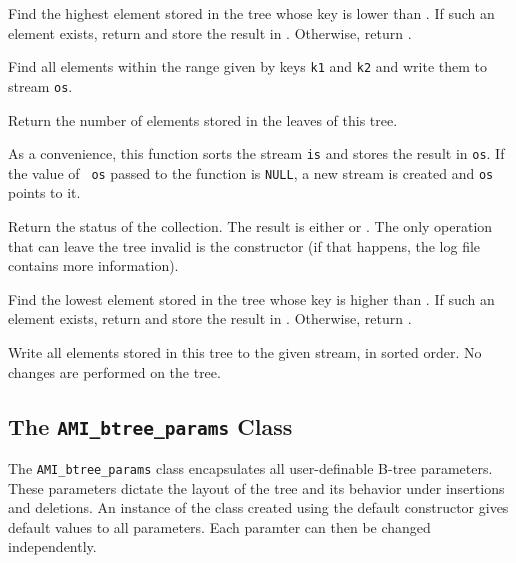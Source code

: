     {Find the highest
   element stored in the tree whose key is lower than . If such
   an element exists, return  and store the result in
   . Otherwise, return .}

    {Find all elements within the range given by
   keys {\tt k1} and {\tt k2} and write them to stream {\tt os}.}

    {Return the number of elements
   stored in the leaves of this tree.}

    {As a convenience, this function sorts the
   stream {\tt is} and stores the result in {\tt os}. If the value of {\tt
   os} passed to the function is {\tt NULL}, a new stream is created and
   {\tt os} points to it.}

    {Return the status
   of the collection. The result is either
    or
   . The only operation that can leave
   the tree invalid is the constructor (if that happens, the log file
   contains more information).}

    {Find the lowest
   element stored in the tree whose key is higher than . If such
   an element exists, return  and store the result in
   . Otherwise, return .}

    {Write all
   elements stored in this tree to the given stream, in sorted order. No
   changes are performed on the tree.}

\etabb

\subsection{The {\tt AMI\_btree\_params} Class}\label{ssec:params}
The {\tt AMI\_btree\_params} class encapsulates all user-definable B-tree
parameters. These parameters dictate the layout of the tree and its
behavior under insertions and deletions. An instance of the class created
using the default constructor gives default values to all parameters. Each
paramter can then be changed independently.

